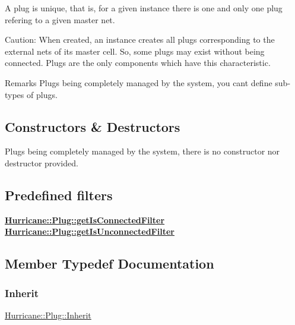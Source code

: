 A plug is unique, that is, for a given instance there is one and only one plug refering to a given master net.

\begin{DoxyParagraph}{Caution\+: When created, an instance creates all plugs corresponding to }
the external nets of its master cell. So, some plugs may exist without being connected. Plugs are the only components which have this characteristic.
\end{DoxyParagraph}
\begin{DoxyRemark}{Remarks}
Plugs being completely managed by the system, you can\textquotesingle{}t define sub-\/types of plugs.
\end{DoxyRemark}
\hypertarget{classHurricane_1_1Plug_secPlugConstructors}{}\subsection{Constructors \& Destructors}\label{classHurricane_1_1Plug_secPlugConstructors}
Plugs being completely managed by the system, there is no constructor nor destructor provided.\hypertarget{classHurricane_1_1Plug_secPlugPredefinedFilters}{}\subsection{Predefined filters}\label{classHurricane_1_1Plug_secPlugPredefinedFilters}
{\bfseries \mbox{\hyperlink{classHurricane_1_1Plug_a51bd5d04a337544709950d7cace05f0d}{Hurricane\+::\+Plug\+::get\+Is\+Connected\+Filter}}} {\bfseries \mbox{\hyperlink{classHurricane_1_1Plug_af27b873ed2420329a63ea67dcc243f07}{Hurricane\+::\+Plug\+::get\+Is\+Unconnected\+Filter}}} 

\subsection{Member Typedef Documentation}
\mbox{\label{classHurricane_1_1Plug_a71bee60105cbd9fdc5f0f2e5b793eeca}} 
\subsubsection{\texorpdfstring{Inherit}{Inherit}}
{\footnotesize\ttfamily \mbox{\hyperlink{classHurricane_1_1Plug_a71bee60105cbd9fdc5f0f2e5b793eeca}{Hurricane\+::\+Plug\+::\+Inherit}}}

